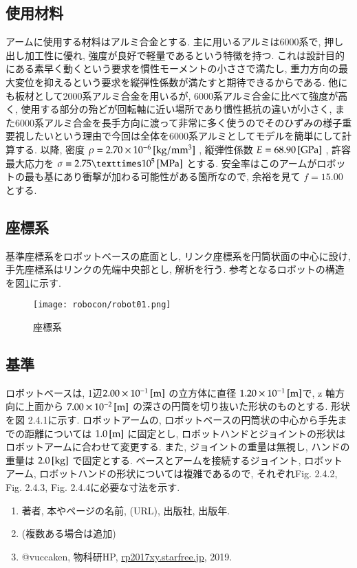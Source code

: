 \documentclass[10pt,b5paper,papersize,dvipdfmx]{jsbook}
\begin{document}
\subsection{使用材料}
アームに使用する材料はアルミ合金とする. 主に用いるアルミは6000系で, 押し出し加工性に優れ, 強度が良好で軽量であるという特徴を持つ. これは設計目的にある素早く動くという要求を慣性モーメントの小ささで満たし, 重力方向の最大変位を抑えるという要求を縦弾性係数が満たすと期待できるからである. 他にも板材として2000系アルミ合金を用いるが, 6000系アルミ合金に比べて強度が高く, 使用する部分の殆どが回転軸に近い場所であり慣性抵抗の違いが小さく, また6000系アルミ合金を長手方向に渡って非常に多く使うのでそのひずみの様子重要視したいという理由で今回は全体を6000系アルミとしてモデルを簡単にして計算する. 以降, 密度 $\rho=2.70\times 10^{-6}\tani*{kg/mm^3}$ , 縦弾性係数 $E=68.90 \tani*{GPa}$ , 許容最大応力を $\sigma=2.75×10^{5} \tani*{MPa}$ とする. 安全率はこのアームがロボットの最も基にあり衝撃が加わる可能性がある箇所なので, 余裕を見て $f=15.00$ とする.
\subsection{座標系}
基準座標系をロボットベースの底面とし, リンク座標系を円筒状面の中心に設け, 手先座標系はリンクの先端中央部とし, 解析を行う. 参考となるロボットの構造を図\ref{fig:robot01}に示す. 
\begin{figure}[H]
  \centering
  \texttt{[image: robocon/robot01.png]}
  \caption{座標系}
  \label{fig:robot01}
\end{figure}
\subsection{基準}
ロボットベースは, 1辺$2.00\times10^{-1} \tani*{m}$ の立方体に直径 $1.20\times10^{-1} \tani*{m} $で,  z 軸方向に上面から $7.00\times10^{-2} \tani*{m}$ の深さの円筒を切り抜いた形状のものとする. 形状を図 2.4.1に示す. 
ロボットアームの, ロボットベースの円筒状の中心から手先までの距離については $1.0\tani*{m}$ に固定とし, ロボットハンドとジョイントの形状はロボットアームに合わせて変更する. また, ジョイントの重量は無視し, ハンドの重量は $2.0\tani*{kg}$ で固定とする. 
ベースとアームを接続するジョイント, ロボットアーム, ロボットハンドの形状については複雑であるので, それぞれFig. 2.4.2, Fig. 2.4.3, Fig. 2.4.4に必要な寸法を示す.

\clearpage
\begin{sanko}  \begin{enumerate}
    \item 著者, 本やページの名前, (URL), 出版社, 出版年.
    \item (複数ある場合は追加)
    \item @vuccaken, 物科研HP, \url{rp2017xy.starfree.jp}, 2019.
  \end{enumerate}
\end{sanko}
\end{document}
